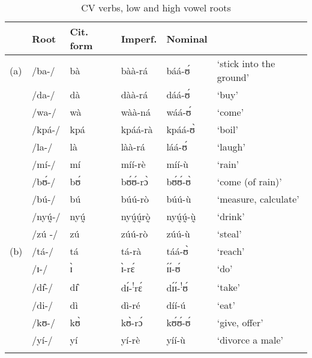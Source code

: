 \documentclass[output=paper,newtxmath,modfonts,nonflat,draftmode]{langsci/langscibook}
\begin{document}
\begin{table}
\begin{tabularx}{\textwidth}{lllllX}
\lsptoprule
& {Root} & {Cit. form} & {Imperf.} & {Nominal} & \\
\midrule
(a) & /ba-/ & bà & bàà-rá & báá-ʊ́ & ‘stick into the ground’\\
& /da-/ & dà & dàà-rá & dáá-ʊ́ & ‘buy’\\
& /wa-/ & wà & wàà-ná & wáá-ʊ́ & ‘come’\\
& /kpá-/ & kpá  & kpáá-rà  & kpáá-ʊ̀  & ‘boil’\\
& /la-/ & là  & làà-rá  & láá-ʊ́  & ‘laugh’\\
& /mí-/ & mí  & míí-rè	& míí-ù  & ‘rain’\\
& /bʊ́-/ & bʊ́ & bʊ́ʊ́-rɔ̀ &	bʊ́ʊ́-ʊ̀ & ‘come (of rain)’\\
& /bú-/ & bú & búú-rò	&	búú-ù	 & ‘measure, calculate’\\
& /nyṵ́-/ & nyṵ́ & nyṵ́ṵ́rò̰ &	nyṵ́ṵ́-ṵ̀\footnotemark[6]& ‘drink’\\
& /zú{} -/ & z\'u{}  & zúú-rò &	zúú-ù & ‘steal’\\
\tablevspace
(b) & /tá-/ & tá & tá-rà &	táá-ʊ̀ & ‘reach’\\
& /ɪ-/ & ɪ̀ & ɪ̀-rɛ́ &	ɪ́ɪ́-ʊ́ & ‘do’\\
& /dɪ̂-/ & dɪ̂ & dɪ́-\textsuperscript{!}rɛ́ & dɪ́ɪ́-\textsuperscript{!}ʊ́  & ‘take’\\
& /di-/ & dì & dì-ré & díí-ú & ‘eat’\\
& /kʊ-/ & kʊ̀ & kʊ̀-rɔ́ &	kʊ́ʊ́-ʊ́ & ‘give, offer’\\
& /yí-/ & yí{}  & yí-rè &	yíí-ù  & ‘divorce a male’\\
\lspbottomrule
\end{tabularx} 
\caption{CV verbs, low and high vowel roots}
\label{tab:anttila:6}
\end{table}

\end{document}
